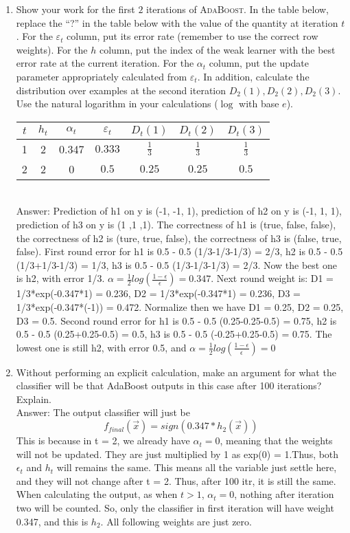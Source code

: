 \documentclass[11pt]{article}
\begin{document}
\begin{enumerate}[(1)]

\item Show your work for the first $2$ iterations of \textsc{AdaBoost}.
  In the table below, replace the ``?'' in the table below with the value of the
  quantity at iteration $t$.
  For the $\varepsilon_t$ column, put its error rate (remember to use the correct row weights).  
  For the $h$ column, put the index of the weak learner with the best error rate at the current iteration.
  For the $\alpha_t$ column, put the update parameter appropriately calculated from $\varepsilon_t$.
  In addition, calculate the distribution over examples at the second iteration $D_{2}(1), D_{2}(2), D_{2}(3)$.
  Use the natural logarithm in your calculations ($\log$ with base $e$).

\begin{tabular}{c|ccc|ccc}
$t$ & $h_t$ & $\alpha_t$ & $\varepsilon_t$ & $D_{t}(1)$ & $D_{t}(2)$ & $D_{t}(3)$ \\ \hline
1 & 2 & 0.347 & $ 0.333 $ & $ \frac{1}{3} $ & $ \frac{1}{3} $ & $ \frac{1}{3} $ \\
2 & 2 & 0 & $ 0.5 $ & $ 0.25 $ & $ 0.25 $ & $ 0.5 $ \\
\end{tabular}
\\Answer: Prediction of h1 on y is (-1, -1, 1), prediction of h2 on y is (-1, 1, 1), prediction of h3 on y is (1 ,1 ,1). The correctness of h1 is (true, false, false), the correctness of h2 is (ture, true, false), the correctness of h3 is (false, true, false). First round error for h1 is 0.5 - 0.5 (1/3-1/3-1/3) = 2/3, h2 is 0.5 - 0.5 (1/3+1/3-1/3) = 1/3, h3 is 0.5 - 0.5 (1/3-1/3-1/3) = 2/3. Now the best one is h2, with error 1/3. $\alpha=\frac{1}{2}log(\frac{1-\epsilon}{\epsilon})=0.347$. Next round weight is: D1 = 1/3*exp(-0.347*1) = 0.236, D2 = 1/3*exp(-0.347*1) = 0.236, D3 = 1/3*exp(-0.347*(-1)) = 0.472. Normalize then we have D1 = 0.25, D2 = 0.25, D3 = 0.5. Second round error for h1 is 0.5 - 0.5 (0.25-0.25-0.5) = 0.75, h2 is 0.5 - 0.5 (0.25+0.25-0.5) = 0.5, h3 is 0.5 - 0.5 (-0.25+0.25-0.5) = 0.75. The lowest one is still h2, with error 0.5, and $\alpha=\frac{1}{2}log(\frac{1-\epsilon}{\epsilon})=0$
\item Without performing an explicit calculation, make an argument for what the classifier will be that AdaBoost outputs in this case after 100 iterations?  Explain.\\
Answer: The output classifier will just be $$f_{final}(\vec x) = sign(0.347*h_2(\vec x))$$
This is because in t = 2, we already have $\alpha_t = 0$, meaning that the weights will not be updated. They are just multiplied by 1 as exp(0) = 1.Thus, both $\epsilon_t$ and $h_t$ will remains the same. This means all the variable just settle here, and they will not change after t = 2. Thus, after 100 itr, it is still the same. When calculating the output, as when $t > 1$, $\alpha_t = 0$, nothing after iteration two will be counted. So, only the classifier in first iteration will have weight 0.347, and this is $h_2$. All following weights are just zero.


\end{enumerate}
\end{document}
